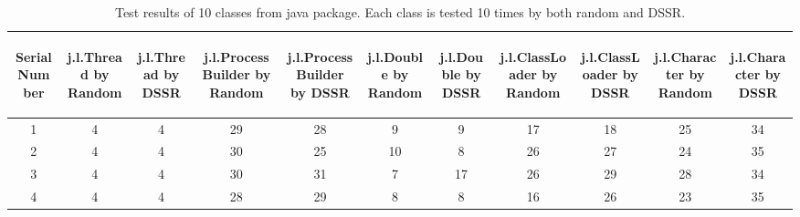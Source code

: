 \documentclass[10pt, conference, compsocconf]{IEEEtran}
\begin{document}
\begin{table}[ht]
\caption{Test results of 10 classes from java package. Each class is tested 10 times by both random and DSSR.} %
\centering %

\begin{tabular}{| c | c | c | c | c | c | c | c | c | c | c |} %
\hline\hline %
 \begin{sideways} Serial Number \end{sideways} & \begin{sideways} j.l.Thread by Random \end{sideways} &  \begin{sideways} j.l.Thread by DSSR \end{sideways} &  \begin{sideways} j.l.ProcessBuilder by Random \end{sideways} &  \begin{sideways} j.l.ProcessBuilder by DSSR \end{sideways} &  \begin{sideways} j.l.Double by Random \end{sideways} & \begin{sideways} j.l.Double by DSSR \end{sideways} &  \begin{sideways} j.l.ClassLoader by Random \end{sideways} &  \begin{sideways} j.l.ClassLoader by DSSR \end{sideways} & \begin{sideways} j.l.Character by Random \end{sideways} & \begin{sideways} j.l.Character by DSSR \end{sideways} \\ [0.5ex] %
\hline %
1 & 4 & 4 & 29 & 28 & 9 & 9 & 17 & 18 & 25 & 34\\ %

2 & 4 & 4 & 30 & 25 & 10 & 8 & 26 & 27 & 24 & 35\\

3 & 4 & 4 & 30 & 31 & 7 & 17 & 26 & 29 & 28 & 34\\

4 & 4 & 4 & 28 & 29 & 8 & 8 & 16 & 26 & 23 & 35\\


\end{tabular}
\end{table}
\end{document}
